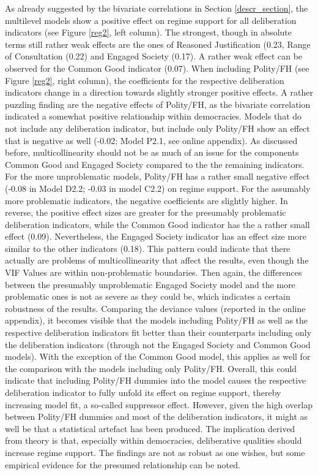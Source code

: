 \documentclass[]{article}
\begin{document}
As already suggested by the bivariate correlations in Section
\ref{descr_section}, the multilevel models show a positive effect on
regime support for all deliberation indicators (see Figure \ref{reg2},
left column). The strongest, though in absolute terms still rather weak
effects are the ones of Reasoned Justification (0.23, Range of
Consultation (0.22) and Engaged Society (0.17). A rather weak effect can
be observed for the Common Good indicator (0.07). When including
Polity/FH (see Figure \ref{reg2}, right column), the coefficients for
the respective deliberation indicators change in a direction towards
slightly stronger positive effects. A rather puzzling finding are the
negative effects of Polity/FH, as the bivariate correlation indicated a
somewhat positive relationship within democracies. Models that do not
include any deliberation indicator, but include only Polity/FH show an
effect that is negative as well (-0.02; Model P2.1, see online
appendix). As discussed before, multicollinearity should not be as much
of an issue for the components Common Good and Engaged Society compared
to the the remaining indicators. For the more unproblematic models,
Polity/FH has a rather small negative effect (-0.08 in Model D2.2; -0.03
in model C2.2) on regime support. For the assumably more problematic
indicators, the negative coefficients are slightly higher. In reverse,
the positive effect sizes are greater for the presumably problematic
deliberation indicators, while the Common Good indicator has the a
rather small effect (0.09). Nevertheless, the Engaged Society indicator
has an effect size more similar to the other indicators (0.18). This
pattern could indicate that there actually are problems of
multicollinearity that affect the results, even though the VIF Values
are within non-problematic boundaries. Then again, the differences
between the presumably unproblematic Engaged Society model and the more
problematic ones is not as severe as they could be, which indicates a
certain robustness of the results. Comparing the deviance values
(reported in the online appendix), it becomes visible that the models
including Polity/FH as well as the respective deliberation indicators
fit better than their counterparts including only the deliberation
indicators (through not the Engaged Society and Common Good models).
With the exception of the Common Good model, this applies as well for
the comparison with the models including only Polity/FH. Overall, this
could indicate that including Polity/FH dummies into the model causes
the respective deliberation indicator to fully unfold its effect on
regime support, thereby increasing model fit, a so-called suppressor
effect. However, given the high overlap between Polity/FH dummies and
most of the deliberation indicators, it might as well be that a
statistical artefact has been produced. The implication derived from
theory is that, especially within democracies, deliberative qualities
should increase regime support. The findings are not as robust as one
wishes, but some empirical evidence for the presumed relationship can be
noted.
\end{document}
